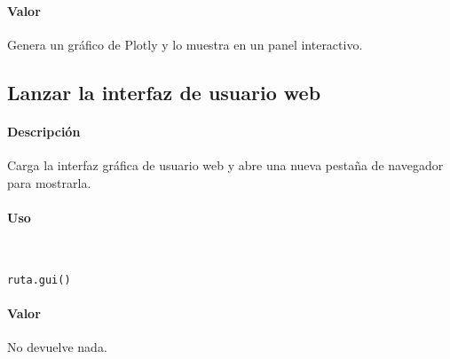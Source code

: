 \paragraph{Valor}
Genera un gráfico de Plotly y lo muestra en un panel interactivo.


\subsection{Lanzar la interfaz de usuario web}

\paragraph{Descripción}
Carga la interfaz gráfica de usuario web y abre una nueva pestaña de navegador para mostrarla.

\paragraph{Uso}
~

\begin{lstlisting}
ruta.gui()
\end{lstlisting}

\paragraph{Valor}
No devuelve nada.